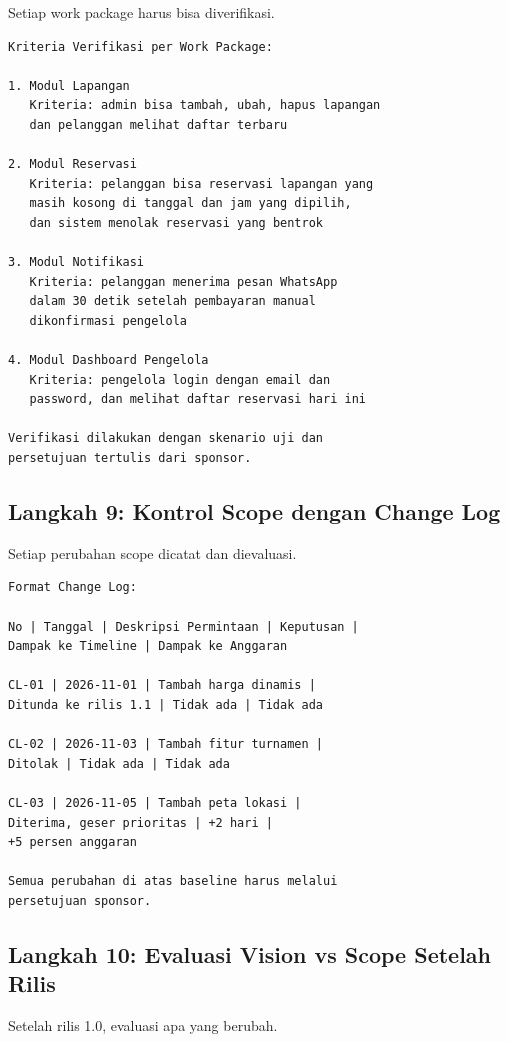 \documentclass[11pt,a4paper]{article}
\begin{document}
Setiap work package harus bisa diverifikasi.

\begin{lstlisting}[style=out]
Kriteria Verifikasi per Work Package:

1. Modul Lapangan
   Kriteria: admin bisa tambah, ubah, hapus lapangan
   dan pelanggan melihat daftar terbaru

2. Modul Reservasi
   Kriteria: pelanggan bisa reservasi lapangan yang
   masih kosong di tanggal dan jam yang dipilih,
   dan sistem menolak reservasi yang bentrok

3. Modul Notifikasi
   Kriteria: pelanggan menerima pesan WhatsApp
   dalam 30 detik setelah pembayaran manual
   dikonfirmasi pengelola

4. Modul Dashboard Pengelola
   Kriteria: pengelola login dengan email dan
   password, dan melihat daftar reservasi hari ini

Verifikasi dilakukan dengan skenario uji dan
persetujuan tertulis dari sponsor.
\end{lstlisting}

\subsection{Langkah 9: Kontrol Scope dengan Change Log}

Setiap perubahan scope dicatat dan dievaluasi.

\begin{lstlisting}[style=out]
Format Change Log:

No | Tanggal | Deskripsi Permintaan | Keputusan |
Dampak ke Timeline | Dampak ke Anggaran

CL-01 | 2026-11-01 | Tambah harga dinamis |
Ditunda ke rilis 1.1 | Tidak ada | Tidak ada

CL-02 | 2026-11-03 | Tambah fitur turnamen |
Ditolak | Tidak ada | Tidak ada

CL-03 | 2026-11-05 | Tambah peta lokasi |
Diterima, geser prioritas | +2 hari |
+5 persen anggaran

Semua perubahan di atas baseline harus melalui
persetujuan sponsor.
\end{lstlisting}

\subsection{Langkah 10: Evaluasi Vision vs Scope Setelah Rilis}

Setelah rilis 1.0, evaluasi apa yang berubah.
\end{document}
